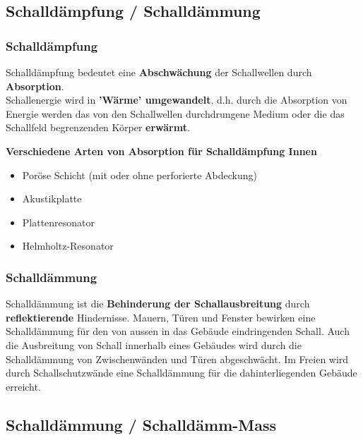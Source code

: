\subsection{Schalldämpfung / Schalldämmung}

\subsubsection{Schalldämpfung}

Schalldämpfung bedeutet eine \textbf{Abschwächung} der Schallwellen durch
\textbf{Absorption}. \\ Schallenergie wird in \textbf{'Wärme' umgewandelt}, d.h. durch die
Absorption von Energie werden das von den Schallwellen
durchdrungene Medium oder die das Schallfeld begrenzenden Körper
\textbf{erwärmt}. \\
\vspace{0.2cm}

\textbf{Verschiedene Arten von Absorption für Schalldämpfung Innen} \\

\begin{itemize}
	\itemsep0em
	\item Poröse Schicht (mit oder ohne perforierte Abdeckung) 
	\item Akustikplatte 
	\item Plattenresonator
	\item Helmholtz-Resonator
\end{itemize}


\subsubsection{Schalldämmung} 

Schalldämmung ist die \textbf{Behinderung der Schallausbreitung} durch
\textbf{reflektierende} Hindernisse. Mauern, Türen und Fenster bewirken eine
Schalldämmung für den von aussen in das Gebäude eindringenden
Schall. Auch die Ausbreitung von Schall innerhalb eines Gebäudes wird
durch die Schalldämmung von Zwischenwänden und Türen
abgeschwächt. Im Freien wird durch Schallschutzwände eine
Schalldämmung für die dahinterliegenden Gebäude erreicht.



\subsection{Schalldämmung / Schalldämm-Mass}

